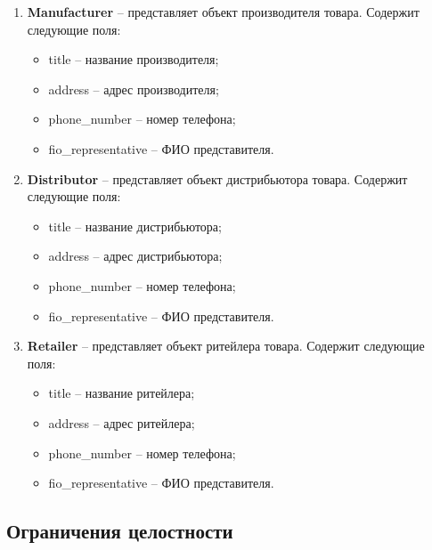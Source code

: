 \begin{enumerate}
	\item \textbf{Manufacturer} -- представляет объект производителя товара. Содержит следующие поля: 
	\begin{itemize}
		\item title -- название производителя;
		\item address -- адрес производителя;
		\item phone\_number -- номер телефона;
		\item fio\_representative -- ФИО представителя.
	\end{itemize}
	
	\item \textbf{Distributor} -- представляет объект дистрибьютора товара. Содержит следующие поля: 
	\begin{itemize}
		\item title -- название дистрибьютора;
		\item address -- адрес дистрибьютора;
		\item phone\_number -- номер телефона;
		\item fio\_representative -- ФИО представителя.
	\end{itemize}
	
	\item \textbf{Retailer} -- представляет объект ритейлера товара. Содержит следующие поля: 
	\begin{itemize}
		\item title -- название ритейлера;
		\item address -- адрес ритейлера;
		\item phone\_number -- номер телефона;
		\item fio\_representative -- ФИО представителя.
	\end{itemize}
	
\end{enumerate}

\subsection{Ограничения целостности}

